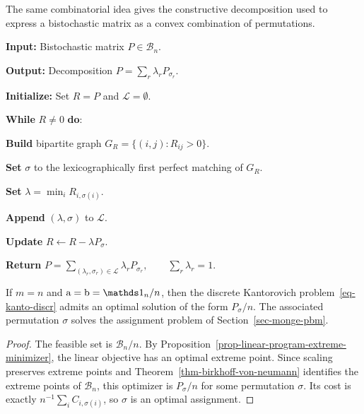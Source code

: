 The same combinatorial idea gives the constructive decomposition used to express a bistochastic matrix as a convex combination of permutations.

\begin{alg}\label{alg:birkhoff-von-neumann-decomposition}
\textbf{Input:} Bistochastic matrix $P\in\mathcal B_n$.

\textbf{Output:} Decomposition $P=\sum_r\lambda_rP_{\sigma_r}$.

\textbf{Initialize:} Set $R=P$ and $\mathcal L=\emptyset$.

\textbf{While} $R\neq0$ \textbf{do}:
\begin{algblock}

\textbf{Build} bipartite graph $G_R=\{(i,j):R_{ij}>0\}$.

\textbf{Set} $\sigma$ to the lexicographically first perfect matching of $G_R$.

\textbf{Set}
\(\lambda=\min_i R_{i,\sigma(i)}.\)

\textbf{Append} $(\lambda,\sigma)$ to $\mathcal L$.

\textbf{Update}
\(R\leftarrow R-\lambda P_\sigma .\)
\end{algblock}
\algreturnskip
\textbf{Return} \(P=\sum_{(\lambda_r,\sigma_r)\in\mathcal L}\lambda_rP_{\sigma_r}, \qquad \sum_r\lambda_r=1.\)
\end{alg}

\begin{cor}\label{cor-kantorovich-matching}
	If $m=n$ and $\a=\b=\ones_n/n$, then the discrete Kantorovich problem~\eqref{eq-kanto-discr} admits an optimal solution of the form $P_\sigma/n$. The associated permutation $\sigma$ solves the assignment problem of Section~\ref{sec-monge-pbm}.
\end{cor}
\begin{proof}
	The feasible set is $\mathcal B_n/n$. By Proposition~\ref{prop-linear-program-extreme-minimizer}, the linear objective has an optimal extreme point. Since scaling preserves extreme points and Theorem~\ref{thm-birkhoff-von-neumann} identifies the extreme points of $\mathcal B_n$, this optimizer is $P_\sigma/n$ for some permutation $\sigma$. Its cost is exactly $n^{-1}\sum_i C_{i,\sigma(i)}$, so $\sigma$ is an optimal assignment.
\end{proof}

